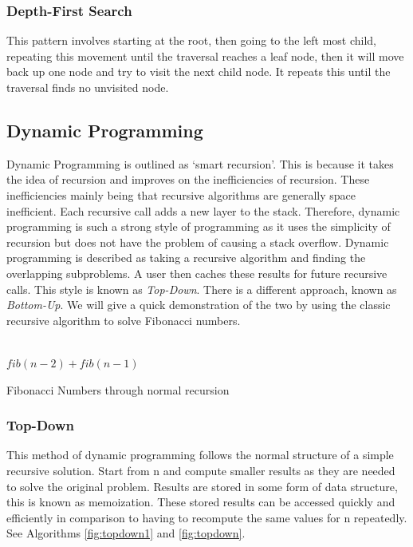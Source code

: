 \documentclass[10pt,twocolumn,hidelinks]{IEEEtran}
\begin{document}
\subsubsection{Depth-First Search}
This pattern involves starting at the root, then going to the left most child, repeating this movement until the traversal reaches a leaf node, then it will move back up one node and try to visit the next child node. It repeats this until the traversal finds no unvisited node.
\\

\subsection{Dynamic Programming}
Dynamic Programming is outlined as `smart recursion'. This is because it takes the idea of recursion and improves on the inefficiencies of recursion. These inefficiencies mainly being that recursive algorithms are generally space inefficient. Each recursive call adds a new layer to the stack. Therefore, dynamic programming is such a strong style of programming as it uses the simplicity of recursion but does not have the problem of causing a stack overflow. Dynamic programming  is described as taking a recursive algorithm and finding the overlapping subproblems. A user then caches these results for future recursive calls.
This style is known as \textit{Top-Down}. There is a different approach, known as \textit{Bottom-Up}. We will give a quick demonstration of the two by using the classic recursive algorithm to solve Fibonacci numbers.
\IncMargin{1em}
	\begin{algorithm}
	\LinesNumbered
		
		 {\\}
		\Return $fib(n-2) + fib(n-1)$
			
	\caption{Fibonacci Numbers through normal recursion}
	\end{algorithm}
\DecMargin{1em}
	
	\subsubsection{Top-Down}
	This method of dynamic programming follows the normal structure of a simple recursive solution. Start from n and compute smaller results as they are needed to solve the original problem. Results are stored in some form of data structure, this is known as memoization. These stored results can be accessed quickly and efficiently in comparison to having to recompute the same values for n repeatedly. See Algorithms \ref{fig:topdown1} and \ref{fig:topdown}.
	
\end{document}
